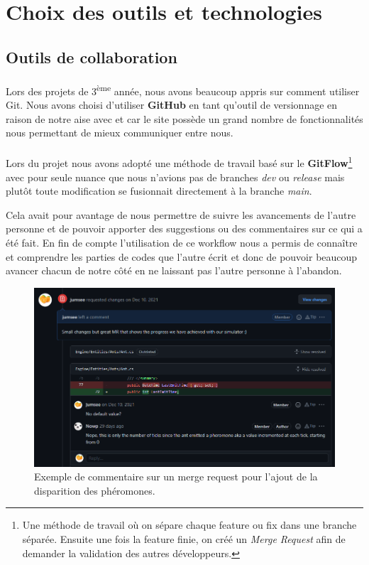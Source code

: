 \documentclass{EPUProjetDi}
\begin{document}
\section{Choix des outils et technologies}

\subsection{Outils de collaboration}

\paragraph{}
Lors des projets de 3\textsuperscript{ème} année, nous avons beaucoup appris sur comment utiliser
Git. Nous avons choisi d'utiliser \textbf{GitHub} en tant qu'outil de versionnage en raison de notre aise avec et
car le site possède un grand nombre de fonctionnalités nous permettant de mieux communiquer entre
nous.

\paragraph{}
Lors du projet nous avons adopté une méthode de travail basé sur le \textbf{GitFlow}\footnote{Une méthode de travail où on sépare chaque feature ou fix dans une branche séparée.
Ensuite une fois la feature finie, on créé un \textit{Merge Request} afin de demander la validation des autres développeurs.} avec pour seule nuance que nous n'avions pas de branches \textit{dev} ou \textit{release}
mais plutôt toute modification se fusionnait directement à la branche \textit{main}.

Cela avait pour avantage de nous permettre de suivre les avancements de l'autre personne et de pouvoir 
apporter des suggestions ou des commentaires sur ce qui a été fait. 
En fin de compte l'utilisation de ce workflow nous a permis de connaître et comprendre 
les parties de codes que l'autre écrit et donc de pouvoir beaucoup avancer chacun de notre
côté en ne laissant pas l'autre personne à l'abandon.

\begin{figure}[h!]
\centering
\includegraphics[scale=.5]{merge_request.png}
\caption{Exemple de commentaire sur un merge request pour l'ajout de la disparition des phéromones.}
\label{fig:MergeRequest}
\end{figure}
\end{document}
